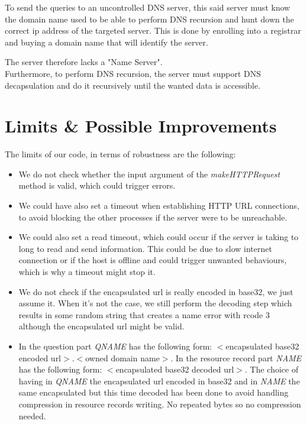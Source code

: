\documentclass[a4paper, 11pt]{article}
\begin{document}
To send the queries to an uncontrolled DNS server, this said server must know the domain name used to be able to perform DNS recursion and hunt down the correct ip address of the targeted server. This is done by enrolling into a registrar and buying a domain name that will identify the server. 

The server therefore lacks a "Name Server".\\


Furthermore, to perform DNS recursion, the server must support DNS decapsulation and do it recursively until the wanted data is accessible.


\section{Limits \& Possible Improvements}

The limits of our code, in terms of robustness are the following:

\begin{itemize}
    \item  We do not check whether the input argument of the \textit{makeHTTPRequest} method is valid, which could trigger errors.

    \item We could have also set a timeout when establishing HTTP URL connections, to avoid blocking the other processes if the server were to be unreachable. 

    \item We could also set a read timeout, which could occur if the server is taking to long to read and send information. This could be due to slow internet connection or if the host is offline and could trigger unwanted behaviours, which is why a timeout might stop it.

    \item We do not check if the encapsulated url is really encoded in base32, we just assume it. When it's not the case, we still perform the decoding step which results in some random string that creates a name error with rcode 3 although the encapsulated url might be valid.

    \item In the question part \textit{QNAME} has the following form: $<$encapsulated base32 encoded url$>$.$<$owned domain name$>$. In the resource record part \textit{NAME} has the following form: $<$encapsulated base32 decoded url$>$. The choice of having in \textit{QNAME} the encapsulated url encoded in base32 and in \textit{NAME} the same encapsulated but this time decoded has been done to avoid handling compression in resource records writing. No repeated bytes so no compression needed.\\
\end{itemize}
\end{document}
